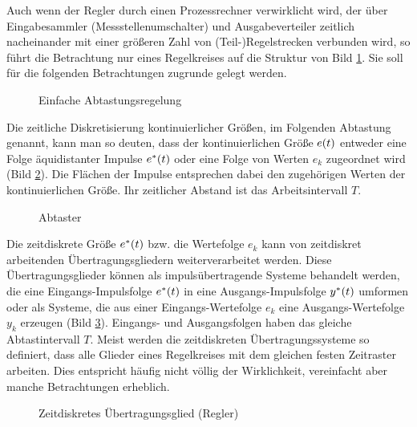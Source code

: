 Auch wenn der Regler durch einen Prozessrechner verwirklicht wird, der über Eingabesammler (Messstellenumschalter) und Ausgabeverteiler zeitlich nacheinander mit einer größeren Zahl von (Teil-)Regelstrecken verbunden wird, so führt die Betrachtung nur eines Regelkreises auf die Struktur von Bild \ref{fig:6-1}.
Sie soll für die folgenden Betrachtungen zugrunde gelegt werden.
\begin{figure}[ht]
	\centering
	\caption{Einfache Abtastungsregelung}
	\label{fig:6-1}
\end{figure}
Die zeitliche Diskretisierung kontinuierlicher Größen, im Folgenden Abtastung genannt, kann man so deuten, dass der kontinuierlichen Größe \(e\parentheses*{t}\) entweder eine Folge äquidistanter Impulse \(e^*\parentheses*{t}\) oder eine Folge von Werten \(e_k\) zugeordnet wird (Bild \ref{fig:6-2}).
Die Flächen der Impulse entsprechen dabei den zugehörigen Werten der kontinuierlichen Größe.
Ihr zeitlicher Abstand ist das Arbeitsintervall \(T\).
\begin{figure}[ht]
	\centering
	\caption{Abtaster}
	\label{fig:6-2}
\end{figure}
Die zeitdiskrete Größe \(e^*\parentheses*{t}\) bzw. die Wertefolge \(e_k\) kann von zeitdiskret arbeitenden Übertragungsgliedern weiterverarbeitet werden.
Diese Übertragungsglieder können als impulsübertragende Systeme behandelt werden, die eine Eingangs-Impulsfolge \(e^*\parentheses*{t}\) in eine Ausgangs-Impulsfolge \(y^*\parentheses*{t}\) umformen oder als Systeme, die aus einer Eingangs-Wertefolge \(e_k\) eine Ausgangs-Wertefolge \(y_k\) erzeugen (Bild \ref{fig:6-3}).
Eingangs- und Ausgangsfolgen haben das gleiche Abtastintervall \(T\).
Meist werden die zeitdiskreten Übertragungssysteme so definiert, dass alle Glieder eines Regelkreises mit dem gleichen festen Zeitraster arbeiten.
Dies entspricht häufig nicht völlig der Wirklichkeit, vereinfacht aber manche Betrachtungen erheblich.
\begin{figure}[ht]
	\centering
	\caption{Zeitdiskretes Übertragungsglied (Regler)}
	\label{fig:6-3}
\end{figure}
